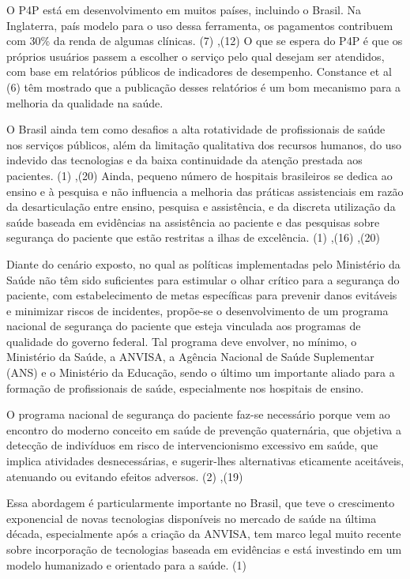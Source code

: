 \documentclass{article}
\begin{document}
O P4P está em desenvolvimento em muitos países, incluindo o Brasil. Na
Inglaterra, país
modelo para o uso dessa ferramenta, os pagamentos contribuem com 30\% da renda
de algumas
clínicas. (7)
,(12)
O que se espera do P4P é que os próprios usuários passem a escolher o serviço
pelo
qual desejam ser atendidos, com base em relatórios públicos de indicadores de
desempenho.
Constance et al (6)
têm mostrado que a publicação desses relatórios é um bom mecanismo para a
melhoria
da qualidade na saúde.

O Brasil ainda tem como desafios a alta rotatividade de profissionais de saúde
nos serviços
públicos, além da limitação qualitativa dos recursos humanos, do uso indevido
das
tecnologias e da baixa continuidade da atenção prestada aos pacientes. (1)
,(20)
Ainda, pequeno número de hospitais brasileiros se dedica ao ensino e à pesquisa
e
não influencia a melhoria das práticas assistenciais em razão da desarticulação
entre
ensino, pesquisa e assistência, e da discreta utilização da saúde baseada em
evidências na
assistência ao paciente e das pesquisas sobre segurança do paciente que estão
restritas a
ilhas de excelência. (1)
,(16)
,(20)

Diante do cenário exposto, no qual as políticas implementadas pelo Ministério da
Saúde não
têm sido suficientes para estimular o olhar crítico para a segurança do
paciente, com
estabelecimento de metas específicas para prevenir danos evitáveis e minimizar
riscos de
incidentes, propõe-se o desenvolvimento de um programa nacional de segurança do
paciente que
esteja vinculada aos programas de qualidade do governo federal. Tal programa
deve envolver,
no mínimo, o Ministério da Saúde, a ANVISA, a Agência Nacional de Saúde
Suplementar (ANS) e
o Ministério da Educação, sendo o último um importante aliado para a formação de
profissionais de saúde, especialmente nos hospitais de ensino.

O programa nacional de segurança do paciente faz-se necessário porque vem ao
encontro do
moderno conceito em saúde de prevenção quaternária, que objetiva a detecção de
indivíduos em
risco de intervencionismo excessivo em saúde, que implica atividades
desnecessárias, e
sugerir-lhes alternativas eticamente aceitáveis, atenuando ou evitando efeitos
adversos.
(2)
,(19)

Essa abordagem é particularmente importante no Brasil, que teve o crescimento
exponencial
de novas tecnologias disponíveis no mercado de saúde na última década,
especialmente após a
criação da ANVISA, tem marco legal muito recente sobre incorporação de
tecnologias baseada
em evidências
e está investindo em um modelo humanizado e orientado para a saúde. (1)
\end{document}

